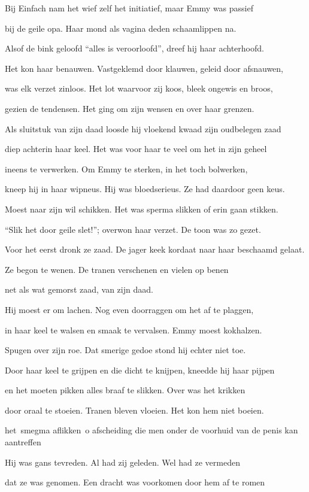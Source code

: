 Bij Einfach nam het wief
zelf het initiatief,
maar Emmy was passief

bij de geile opa.
Haar mond als vagina
deden schaamlippen na.

Alsof de bink geloofd
“alles is veroorloofd”,
dreef hij haar achterhoofd.

Het kon haar benauwen.
Vastgeklemd door klauwen,
geleid door afsnauwen,

was elk verzet zinloos.
Het lot waarvoor zij koos,
bleek ongewis en broos,

gezien de tendensen.
Het ging om zijn wensen
en over haar grenzen.

Als sluitstuk van zijn daad
loosde hij vloekend kwaad
zijn oudbelegen zaad

diep achterin haar keel.
Het was voor haar te veel
om het in zijn geheel

ineens te verwerken.
Om Emmy te sterken,
in het toch bolwerken,

kneep hij in haar wipneus.
Hij was bloedserieus.
Ze had daardoor geen keus.

Moest naar zijn wil schikken.
Het was sperma slikken
of erin gaan stikken.

“Slik het door geile slet!”;
overwon haar verzet.
De toon was zo gezet.

Voor het eerst dronk ze zaad.
De jager keek kordaat
naar haar beschaamd gelaat.

Ze begon te wenen.
De tranen verschenen
en vielen op benen

net als wat gemorst zaad,
van zijn daad.

Hij moest er om lachen.
Nog even doorraggen
om het af te plaggen,

in haar keel te walsen
en smaak te vervalsen.
Emmy moest kokhalzen.

Spugen over zijn roe.
Dat smerige gedoe
stond hij echter niet toe.

Door haar keel te grijpen
en die dicht te knijpen,
kneedde hij haar pijpen

en het moeten pikken
alles braaf te slikken.
Over was het krikken

door oraal te stoeien.
Tranen bleven vloeien.
Het kon hem niet boeien.

het smegma aflikken o
afscheiding die men onder de voorhuid van de penis kan aantreffen

Hij was gans tevreden.
Al had zij geleden.
Wel had ze vermeden

dat ze was genomen.
Een dracht was voorkomen
door hem af te romen

